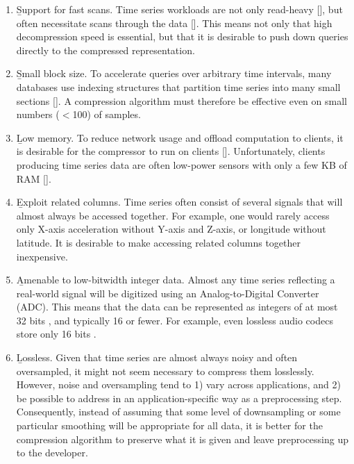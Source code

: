\begin{enumerate}
\itemsep0mm
\item \b{Support for fast scans}. Time series workloads are not only read-heavy [], but often necessitate scans through the data []. This means not only that high decompression speed is essential, but that it is desirable to push down queries directly to the compressed representation.
\item \b{Small block size}. To accelerate queries over arbitrary time intervals, many databases use indexing structures that partition time series into many small sections []. A compression algorithm must therefore be effective even on small numbers ($<$100) of samples.
\item \b{Low memory}. To reduce network usage and offload computation to clients, it is desirable for the compressor to run on clients []. Unfortunately, clients producing time series data are often low-power sensors with only a few KB of RAM [].
\item \b{Exploit related columns}. Time series often consist of several signals that will almost always be accessed together. For example, one would rarely access only X-axis acceleration without Y-axis and Z-axis, or longitude without latitude. It is desirable to make accessing related columns together inexpensive.
\item \b{Amenable to low-bitwidth integer data}. Almost any time series reflecting a real-world signal will be digitized using an Analog-to-Digital Converter (ADC). This means that the data can be represented as integers of at most 32 bits \cite{digikeyADCs}, and typically 16 or fewer. For example, even lossless audio codecs store only 16 bits \cite{flac, shorten}. %
\item \b{Lossless}. Given that time series are almost always noisy and often oversampled, it might not seem necessary to compress them losslessly. However, noise and oversampling tend to 1) vary across applications, and 2) be possible to address in an application-specific way as a preprocessing step. Consequently, instead of assuming that some level of downsampling or some particular smoothing will be appropriate for all data, it is better for the compression algorithm to preserve what it is given and leave preprocessing up to the developer.
\end{enumerate}

